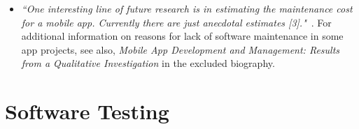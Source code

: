\begin{itemize}
\begin{itemize}
    \end{itemize}
    \item \emph{``One interesting line of future research is in estimating the maintenance cost for a mobile app. Currently there are just anecdotal estimates [3]."}~\citep[p. 27]{nagappan2016_future_trends_in_sw_eng_for_mobile_apps}. For additional information on reasons for lack of software maintenance in some app projects, see also, \emph{Mobile App Development and Management: Results from a Qualitative Investigation} in the excluded biography.
    
\end{itemize}


\section{Software Testing}

